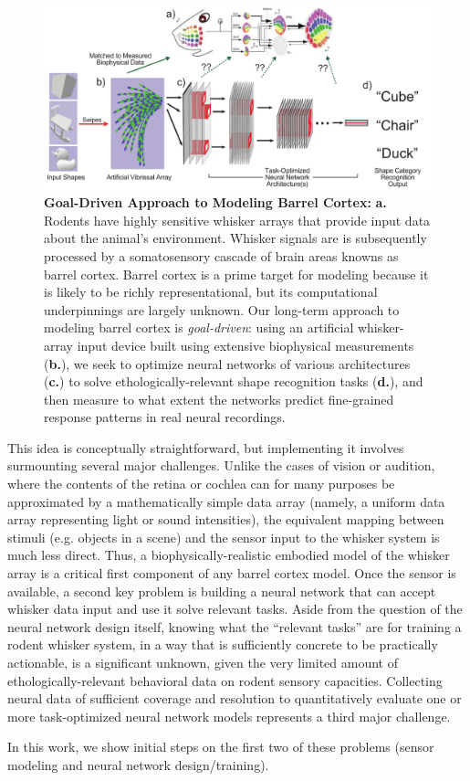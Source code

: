 \begin{figure}
\centering
\includegraphics [width=1\linewidth]{figures/schematic.pdf}
\vspace{-2mm}
\caption{\textbf{Goal-Driven Approach to Modeling Barrel Cortex:} \textbf{a.} Rodents have highly sensitive whisker arrays that provide input data about the animal's environment.  Whisker signals are is subsequently processed by a somatosensory cascade of brain areas knowns as barrel cortex. Barrel cortex is a prime target for modeling because it is likely to be richly representational, but its computational underpinnings are largely unknown. Our long-term approach to modeling barrel cortex is \emph{goal-driven}: using an artificial whisker-array input device built using extensive biophysical measurements (\textbf{b.}), we seek to optimize neural networks of various architectures (\textbf{c.}) to solve ethologically-relevant shape recognition tasks (\textbf{d.}), and then measure to what extent the networks predict fine-grained response patterns in real neural recordings. ~\label{fig_schematic}}
\end{figure}

This idea is conceptually straightforward, but implementing it involves surmounting several major challenges.  
Unlike the cases of vision or audition, where the contents of the retina or cochlea can for many purposes be approximated by a mathematically simple data array (namely, a uniform data array representing light or sound intensities), the equivalent mapping between stimuli (e.g. objects in a scene) and the sensor input to the whisker system is much less direct.   
Thus, a biophysically-realistic embodied model of the whisker array is a critical first component of any barrel cortex model.
Once the sensor is available, a second key problem is building a neural network that can accept whisker data input and use it solve relevant tasks. 
Aside from the question of the neural network design itself, knowing what the ``relevant tasks'' are for training a rodent whisker system, in a way that is sufficiently concrete to be practically actionable, is a significant unknown, given the very limited amount of ethologically-relevant behavioral data on rodent sensory capacities\cite{}.
Collecting neural data of sufficient coverage and resolution to quantitatively evaluate one or more task-optimized neural network models represents a third major challenge.   

In this work, we show initial steps on the first two of these problems (sensor modeling and neural network design/training). 



